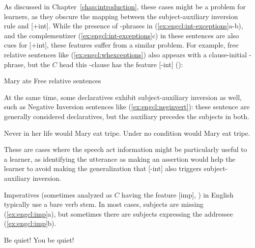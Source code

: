 As discussed in Chapter~\ref{chap:introduction}, these cases might be a problem for learners, as they obscure the mapping between the subject-auxiliary inversion rule and [+int]. While the presence of \twh-phrases in (\ref{ex:engcl:int-exceptions}a-b), and the complementizer  (\ref{ex:engcl:int-exceptions}c) in these sentences are also cues for [+int], these features suffer from a similar problem. For example, free relative sentences like (\ref{ex:engcl:whexceptions}) also appears with a clause-initial \twh-phrase, but the $C$ head this \twh-clause has the feature [-int] (\cite{bresnan1978free, caponigro2003free}):

Mary ate  \hfill Free relative sentences
\eex


At the same time, some declaratives exhibit subject-auxiliary inversion as well, such as Negative Inversion sentences like (\ref{ex:engcl:neginvert}): these sentence are generally considered declaratives, but the auxiliary  precedes the subjects in both.

\bxl{}
Never in her life would Mary eat tripe.
\ex
Under no condition would Mary eat tripe.
\exl
\eex

These are cases where the speech act information might be particularly useful to a learner, as identifying the utterance as making an assertion would help the learner to avoid making the generalization that [-int] also triggers subject-auxiliary inversion. 

Imperatives (sometimes analyzed as $C$ having the feature [imp], \cite{platzack1997imp}) in English typically use a bare verb stem. In most cases, subjects are missing (\ref{ex:engcl:imp}a), but sometimes there are subjects expressing the addressee (\ref{ex:engcl:imp}b).

\bxl{}
Be quiet!
\ex You be quiet!
\exl
\eex


